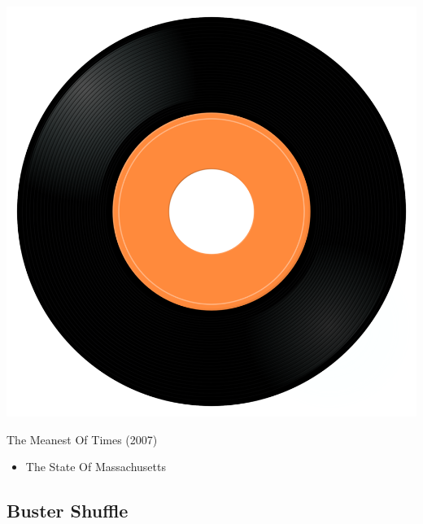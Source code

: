 \begin{minipage}[t]{0.25\textwidth}\vspace{0pt}
\captionsetup{type=figure}
\includegraphics[width=\textwidth]{Images/cover.png}
\caption*{The Meanest Of Times (2007)}
\end{minipage}
\begin{minipage}[t]{0.25\textwidth}\vspace{0pt}
\begin{itemize}[nosep,leftmargin=1em,labelwidth=*,align=left]
	\setlength{\itemsep}{0pt}
	\item The State Of Massachusetts
\end{itemize}
\end{minipage}

\subsection{Buster Shuffle}

